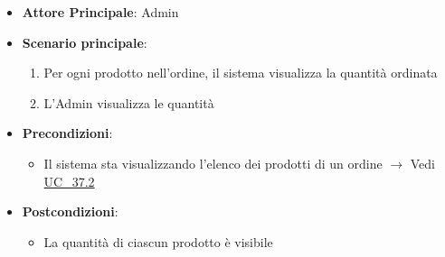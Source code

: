 \label{uc_37.2.3}

\begin{itemize}
    \item \textbf{Attore Principale}: Admin
	\item \textbf{Scenario principale}:
	\begin{enumerate}
		\item Per ogni prodotto nell'ordine, il sistema visualizza la quantità ordinata
		\item L'Admin visualizza le quantità
	\end{enumerate}
	\item \textbf{Precondizioni}:
	\begin{itemize}
		\item Il sistema sta visualizzando l'elenco dei prodotti di un ordine $\rightarrow$ Vedi \hyperref[uc_37.2]{UC\_37.2}
	\end{itemize}
	\item \textbf{Postcondizioni}:
	\begin{itemize}
		\item La quantità di ciascun prodotto è visibile
	\end{itemize}
\end{itemize}